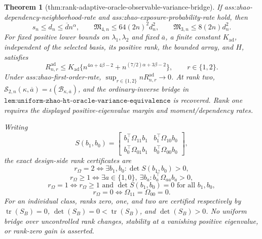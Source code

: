 \documentclass{article}
\newtheorem{theorem}{Theorem}
\begin{document}
\begin{theorem}[thm:rank-adaptive-oracle-observable-variance-bridge]
If ass:zhao-dependency-neighborhood-rate and ass:zhao-exposure-probability-rate hold, then
\[
s_n\le d_n\le\overline d n^\alpha,
\qquad
\mathfrak M_{4,n}\le64(2n)^2d_n^2,
\qquad
\mathfrak M_{3,n}\le8(2n)d_n^2.
\]
For fixed positive lower bounds on \(\lambda_1,\lambda_2\) and fixed \(\overline a\), a finite constant \(K_{\mathrm{ad}}\), independent of the selected basis, its positive rank, the bounded array, and \(H\), satisfies
\[
R_{n,r}^{\mathrm{ad}}
\le K_{\mathrm{ad}}
\{n^{4\alpha+4\beta-2}
+n^{(7/2)\alpha+3\beta-2}\},
\qquad r\in\{1,2\}.
\]
Under ass:zhao-first-order-rate, \(\sup_{r\in\{1,2\}}nR_{n,r}^{\mathrm{ad}}\to0\).  At rank two, \(\mathcal S_{2,n}(\kappa,\overline a)=\iota(\mathcal B_{\kappa,\overline a})\), and the ordinary-inverse bridge in \(\texttt{lem:uniform-zhao-ht-oracle-variance-equivalence}\) is recovered.  Rank one requires the displayed positive-eigenvalue margin and moment/dependency rates.

Writing
\[
S(b_1,b_0)=
\begin{bmatrix}
b_1^{\top}\Omega_{11}b_1&b_1^{\top}\Omega_{10}b_0\\
b_0^{\top}\Omega_{01}b_1&b_0^{\top}\Omega_{00}b_0
\end{bmatrix},
\]
the exact design-side rank certificates are
\[
r_\Omega=2\Longleftrightarrow
\exists b_1,b_0:\det S(b_1,b_0)>0,
\]
\[
r_\Omega\ge1\Longleftrightarrow
\exists a\in\{1,0\},\ \exists b_a:
b_a^{\top}\Omega_{aa}b_a>0,
\]
\[
r_\Omega=1\Longleftrightarrow r_\Omega\ge1
\text{ and }\det S(b_1,b_0)=0\text{ for all }b_1,b_0,
\]
\[
r_\Omega=0\Longleftrightarrow\Omega_{11}=\Omega_{00}=0.
\]
For an individual class, ranks zero, one, and two are certified respectively by \(\operatorname{tr}(S_B)=0\), \(\det(S_B)=0<\operatorname{tr}(S_B)\), and \(\det(S_B)>0\).  No uniform bridge over uncontrolled rank changes, stability at a vanishing positive eigenvalue, or rank-zero gain is asserted.
\end{theorem}
\end{document}
